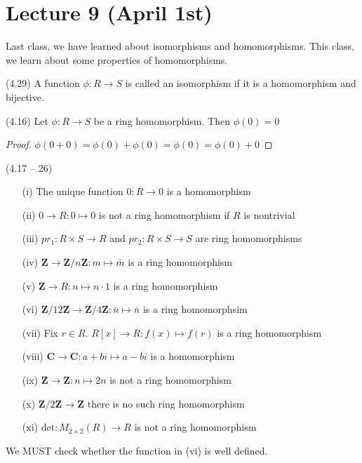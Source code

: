 \section{Lecture 9 (April 1st)}
Last class, we have learned about isomorphisms and homomorphisms. This class, we learn about some properties of homomorphisms.
\\
\begin{defi}
(4.29) A function $\phi :R\rightarrow S$ is called an isomorphism if it is a homomorphism and bijective. 
\end{defi}
\vspace{2ex}
\begin{prop}
(4.16) Let $\phi :R\rightarrow S$ be a ring homomorphism. Then $\phi(0)=0$ 
\end{prop}
\vspace{2ex}
\begin{proof}
$\phi (0+0)=\phi (0)+\phi (0)=\phi (0)=\phi (0)+0$
\end{proof}
\vspace{2ex}
\begin{ex}
(4.17 -- 26) 
\begin{itemize}
\item[(i)] The unique function $0:R\rightarrow 0$ is a homomorphism
\item[(ii)] $0\rightarrow R:0\mapsto 0$ is not a ring homomorphism if $R$ is nontrivial
\item[(iii)] $pr_{1}:R\times S\rightarrow R$ and $pr_{2}:R\times S\rightarrow S$ are ring homomorphisms
\item[(iv)] ${\bm Z}\rightarrow {\bm Z}/n{\bm Z}:m\mapsto \bar{m}$ is a ring homomorphism
\item[(v)] ${\bm Z}\rightarrow R:n\mapsto n\cdot 1$ is a ring homomorphism
\item[(vi)] ${\bm Z}/12{\bm Z}\rightarrow {\bm Z}/4{\bm Z}:\bar{n}\mapsto \bar{n}$ is a ring homomorphsim
\item[(vii)] Fix $r\in R$. $R[x]\rightarrow R:f(x)\mapsto f(r)$ is a ring homomorphism
\item[(viii)] ${\bm C}\rightarrow {\bm C}:a+bi\mapsto a-bi$ is a homomorphism
\item[(ix)] ${\bm Z}\rightarrow {\bm Z}:n\mapsto 2n$ is not a ring homomorphism
\item[(x)] ${\bm Z}/2{\bm Z}\rightarrow {\bm Z}$ there is no such ring homomorphism
\item[(xi)] $\mathrm{det}:M_{2\times 2}(R)\rightarrow R$ is not a ring homomorphism
\end{itemize}
We MUST check whether the function in (vi) is well defined. 
\end{ex}
